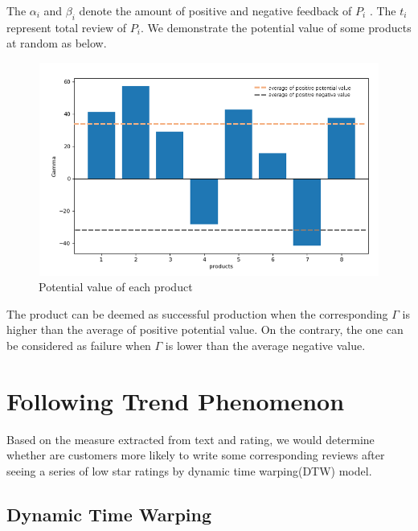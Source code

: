 \documentclass[12pt]{article}%
\begin{document}
The  $\alpha_{i}$ and $\beta_{i}$ denote the amount of positive and negative feedback of $P_{i}$ . The $t_{i}$ represent total review of $P_{i}$. We demonstrate the potential value of some products at random as below. 

\begin{figure}[H]
	\centering
	\includegraphics[height=7cm,width=13cm]{Figure2.png}%
	\caption{Potential value of each product}\label{llsssaall}%
\end{figure}

The product can be deemed as successful production when the corresponding $\Gamma$ is higher than the average of positive potential value. On the contrary, the one can be considered as failure when $\Gamma$ is lower than the average negative value.

\section{Following Trend Phenomenon}
Based on the measure extracted from text and rating, we would determine whether are customers more likely to write some corresponding reviews after seeing a series of low star ratings by dynamic time warping(DTW) model.
\subsection{Dynamic Time Warping}
\end{document}
